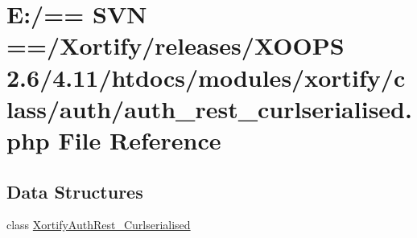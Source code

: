 \hypertarget{auth__rest__curlserialised_8php}{\section{E\-:/== S\-V\-N ==/\-Xortify/releases/\-X\-O\-O\-P\-S 2.6/4.11/htdocs/modules/xortify/class/auth/auth\-\_\-rest\-\_\-curlserialised.php File Reference}
\label{auth__rest__curlserialised_8php}
}
\subsection*{Data Structures}
\begin{DoxyCompactItemize}
\item 
class \hyperlink{class_xortify_auth_rest___curlserialised}{Xortify\-Auth\-Rest\-\_\-\-Curlserialised}
\end{DoxyCompactItemize}
